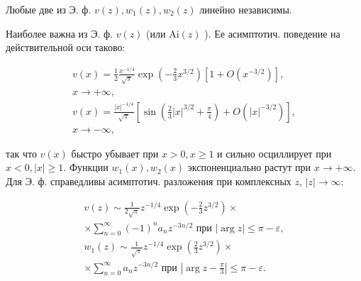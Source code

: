 \documentclass[10pt]{article}
\begin{document}
Любые две из Э. ф. $v(z), w_{1}(z), w_{2}(z)$ линейно независимы.



Наиболее важна из Э. ф. $v(z)$ (или $\mathrm{Ai}(z)$ ). Ее асимптотич. поведение на действительной оси таково:



\[

\begin{gathered}

v(x)=\frac{1}{2} \frac{x^{-1 / 4}}{\sqrt{\pi}} \exp \left(-\frac{2}{3} x^{3 / 2}\right)\left[1+O\left(x^{-3 / 2}\right)\right], \\

x \longrightarrow+\infty, \\

v(x)=\frac{|x|^{-1 / 4}}{\sqrt{\pi}}\left[\sin \left(\frac{2}{3}|x|^{3 / 2}+\frac{\pi}{4}\right)+O\left(|x|^{-3 / 2}\right)\right], \\

x \longrightarrow-\infty,

\end{gathered}

\]



так что $v(x)$ быстро убывает при $x>0, x \geqslant 1$ и сильно осциллирует при $x<0,|x| \geqslant 1$. Функции $w_{1}(x), w_{2}(x)$ экспоненциально растут при $x \rightarrow+\infty$. Для Э. ф. справедливы асимптотич. разложения при комплексных $z$, $|z| \rightarrow \infty:$



\[

\begin{gathered}

v(z) \sim \frac{1}{2 \sqrt{\pi}} z^{-1 / 4} \exp \left(-\frac{2}{3} z^{3 / 2}\right) \times \\

\times \sum_{n=0}^{\infty}(-1)^{n} a_{n} z^{-3 n / 2} \text { при }|\arg z| \leqslant \pi-\varepsilon, \\

w_{1}(z) \sim \frac{1}{\sqrt{\pi}} z^{-1 / 4} \exp \left(\frac{2}{3} z^{3 / 2}\right) \times \\

\times \sum_{n=0}^{\infty} a_{n} z^{-3 n / 2} \text { при }\left|\arg z-\frac{\pi}{3}\right| \leqslant \pi-\varepsilon .

\end{gathered}

\]
\end{document}
